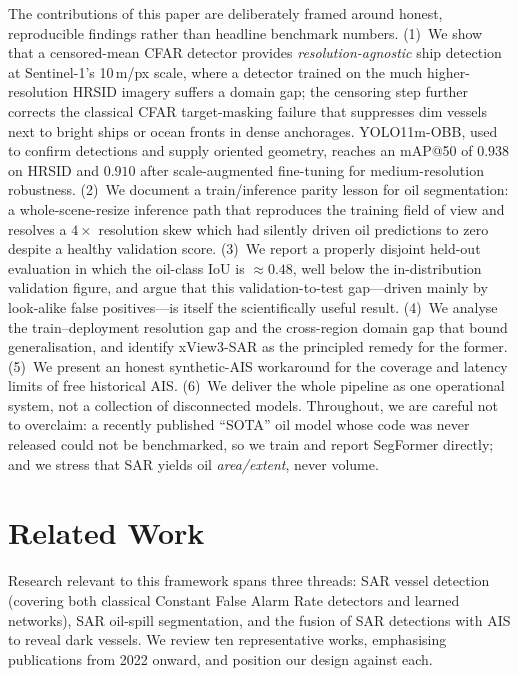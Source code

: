 \documentclass[a4paper,11pt]{article}
\begin{document}
The contributions of this paper are deliberately framed around honest, reproducible
findings rather than headline benchmark numbers. (1)~We show that a censored-mean
CFAR detector provides \emph{resolution-agnostic} ship detection at Sentinel-1's
10\,m/px scale, where a detector trained on the much higher-resolution HRSID imagery
suffers a domain gap; the censoring step further corrects the classical CFAR
target-masking failure that suppresses dim vessels next to bright ships or ocean
fronts in dense anchorages. YOLO11m-OBB, used to confirm detections and supply
oriented geometry, reaches an mAP@50 of $0.938$ on HRSID and $0.910$ after
scale-augmented fine-tuning for medium-resolution robustness. (2)~We document a
train/inference parity lesson for oil segmentation: a whole-scene-resize inference
path that reproduces the training field of view and resolves a $4\times$ resolution
skew which had silently driven oil predictions to zero despite a healthy validation
score. (3)~We report a properly disjoint held-out evaluation in which the oil-class
IoU is $\approx0.48$, well below the in-distribution validation figure, and argue
that this validation-to-test gap---driven mainly by look-alike false positives---is
itself the scientifically useful result. (4)~We analyse the train--deployment
resolution gap and the cross-region domain gap that bound generalisation, and
identify xView3-SAR as the principled remedy for the former. (5)~We
present an honest synthetic-AIS workaround for the coverage and latency limits of
free historical AIS. (6)~We deliver the whole pipeline as one operational system, not
a collection of disconnected models. Throughout, we are careful not to overclaim: a
recently published ``SOTA'' oil model whose code was never released could not be
benchmarked, so we train and report SegFormer directly; and we stress that SAR yields
oil \emph{area/extent}, never volume.

\section{Related Work}

Research relevant to this framework spans three threads: SAR vessel detection
(covering both classical Constant False Alarm Rate detectors and learned networks),
SAR oil-spill segmentation, and the fusion of SAR detections with AIS to reveal dark
vessels. We review ten representative works, emphasising publications from 2022 onward,
and position our design against each.
\end{document}
